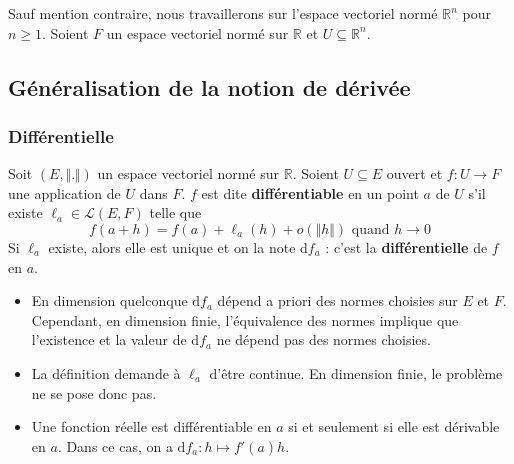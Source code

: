 



	
	Sauf mention contraire, nous travaillerons sur l'espace vectoriel normé $\mathbb{R}^n$ pour $n \geq 1$. Soient $F$ un espace vectoriel normé sur $\mathbb{R}$ et $U \subseteq \mathbb{R}^n$.
	
	\subsection{Généralisation de la notion de dérivée}
	
	\subsubsection{Différentielle}
	
	
	\begin{definition}
		Soit $(E, \Vert . \Vert)$ un espace vectoriel normé sur $\mathbb{R}$. Soient $U \subseteq E$ ouvert et $f : U \rightarrow F$ une application de $U$ dans $F$. $f$ est dite \textbf{différentiable} en un point $a$ de $U$ s'il existe $\ell_a \in \mathcal{L}(E,F)$ telle que
		\[ f(a+h) = f(a) + \ell_a(h) + o(\Vert h \Vert) \text{ quand } h \longrightarrow 0 \]
		Si $\ell_a$ existe, alors elle est unique et on la note $\mathrm{d}f_a$ : c'est la \textbf{différentielle} de $f$ en $a$.
	\end{definition}
	
	\begin{remark}
		\begin{itemize}
			\item En dimension quelconque $\mathrm{d}f_a$ dépend a priori des normes choisies sur $E$ et $F$. Cependant, en dimension finie, l'équivalence des normes implique que l'existence et la valeur de $\mathrm{d}f_a$ ne dépend pas des normes choisies.
			\item La définition demande à $\ell_a$ d'être continue. En dimension finie, le problème ne se pose donc pas.
			\item Une fonction réelle est différentiable en $a$ si et seulement si elle est dérivable en $a$. Dans ce cas, on a $\mathrm{d}f_a : h \mapsto f'(a)h$.
		\end{itemize}
	\end{remark}
	
